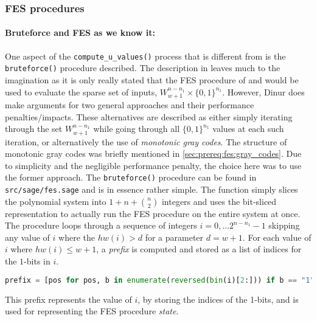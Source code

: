\subsubsection{FES procedures} \label{sec:impl:fes}

\paragraph{Bruteforce and FES as we know it:} One aspect of the \texttt{compute\_u\_values()} process that is different from \cite{cryptoeprint:2021/578} is the \texttt{bruteforce()} procedure described. The description in \cite{cryptoeprint:2021/578} leaves much to the imagination as it is only really stated that the FES procedure of \cite{cryptoeprint:2013/436} and \cite{cryptoeprint:2010/313} would be used to evaluate the sparse set of inputs, $W^{n - n_1}_{w + 1} \times \{0,1\}^{n_1}$. However, Dinur does make arguments for two general approaches and their performance penalties/impacts. These alternatives are described as either simply iterating through the set $W^{n - n_1}_{w + 1}$ while going through all $\{0,1\}^{n_1}$ values at each such iteration, or alternatively the use of \textit{monotonic gray codes}. The structure of monotonic gray codes was briefly mentioned in \cref{sec:prereq:fes:gray_codes}. Due to simplicity and the negligible performance penalty, the choice here was to use the former approach. 
The \texttt{bruteforce()} procedure can be found in \texttt{src/sage/fes.sage} and is in essence rather simple. The function simply slices the polynomial system into $1 + n + \binom{n}{2}$ integers and uses the bit-sliced representation to actually run the FES procedure on the entire system at once. The procedure loops through a sequence of integers $i = 0, \dots 2^{n - n_1} - 1$ skipping any value of $i$ where the $hw(i) > d$ for a parameter $d = w + 1$. For each value of $i$ where $hw(i) \leq w + 1$, a \textit{prefix} is computed and stored as a list of indices for the $1$-bits in $i$.
\begin{lstlisting}[language=python,style=mystyle]
prefix = [pos for pos, b in enumerate(reversed(bin(i)[2:])) if b == "1"]
\end{lstlisting}
This prefix represents the value of $i$, by storing the indices of the 1-bits, and is used for representing the FES procedure \textit{state}.

